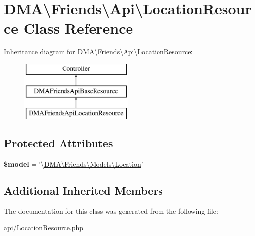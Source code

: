 \hypertarget{classDMA_1_1Friends_1_1Api_1_1LocationResource}{\section{D\+M\+A\textbackslash{}Friends\textbackslash{}Api\textbackslash{}Location\+Resource Class Reference}
\label{classDMA_1_1Friends_1_1Api_1_1LocationResource}
}
Inheritance diagram for D\+M\+A\textbackslash{}Friends\textbackslash{}Api\textbackslash{}Location\+Resource\+:\begin{figure}[H]
\begin{center}
\leavevmode
\includegraphics[height=3.000000cm]{d3/d3e/classDMA_1_1Friends_1_1Api_1_1LocationResource}
\end{center}
\end{figure}
\subsection*{Protected Attributes}
\begin{DoxyCompactItemize}
\item 
\hypertarget{classDMA_1_1Friends_1_1Api_1_1LocationResource_a32a593bbeba6c699743670fda7bae672}{{\bfseries \$model} = '\textbackslash{}\hyperlink{classDMA_1_1Friends_1_1Models_1_1Location}{D\+M\+A\textbackslash{}\+Friends\textbackslash{}\+Models\textbackslash{}\+Location}'}\label{classDMA_1_1Friends_1_1Api_1_1LocationResource_a32a593bbeba6c699743670fda7bae672}

\end{DoxyCompactItemize}
\subsection*{Additional Inherited Members}


The documentation for this class was generated from the following file\+:\begin{DoxyCompactItemize}
\item 
api/Location\+Resource.\+php\end{DoxyCompactItemize}
